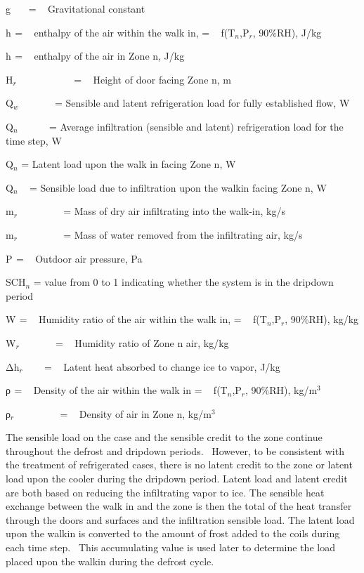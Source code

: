 g~~~ = ~ Gravitational constant

h\(_{ }\) = ~ enthalpy of the air within the walk in, = ~ f(T\(_{n}\),P\(_{r}\), 90\%RH), J/kg

h\(_{ }\) = ~ enthalpy of the air in Zone n, J/kg

H\(_{r}\)~~~~~~~~~~~ = ~ Height of door facing Zone n, m

Q\(_{w}\) ~~~~~~ = Sensible and latent refrigeration load for fully established flow, W

Q\(_{n}\) ~~~~~ = Average infiltration (sensible and latent) refrigeration load for the time step, W

Q\(_{n}\) = Latent load upon the walk in facing Zone n, W

Q\(_{n}\) ~ = Sensible load due to infiltration upon the walkin facing Zone n, W

m\(_{r}\) ~~~~~~~~ = Mass of dry air infiltrating into the walk-in, kg/s

m\(_{r}\) ~~~~~~~~ = Mass of water removed from the infiltrating air, kg/s

P\(_{ }\) = ~ Outdoor air pressure, Pa

SCH\(_{n}\) = value from 0 to 1 indicating whether the system is in the dripdown period

W\(_{ }\) = ~ Humidity ratio of the air within the walk in, = ~ f(T\(_{n}\),P\(_{r}\), 90\%RH), kg/kg

W\(_{r}\) ~~~~~~ = ~ Humidity ratio of Zone n air, kg/kg

Δh\(_{r}\) ~~~ = ~ Latent heat absorbed to change ice to vapor, J/kg

ρ\(_{ }\) = ~ Density of the air within the walk in = ~ f(T\(_{n}\),P\(_{r}\), 90\%RH), kg/m\(^{3}\)

ρ\(_{r}\) ~~~~~~~~ = ~ Density of air in Zone n, kg/m\(^{3}\)

The sensible load on the case and the sensible credit to the zone continue throughout the defrost and dripdown periods.~ However, to be consistent with the treatment of refrigerated cases, there is no latent credit to the zone or latent load upon the cooler during the dripdown period. Latent load and latent credit are both based on reducing the infiltrating vapor to ice. The sensible heat exchange between the walk in and the zone is then the total of the heat transfer through the doors and surfaces and the infiltration sensible load. The latent load upon the walkin is converted to the amount of frost added to the coils during each time step.~ This accumulating value is used later to determine the load placed upon the walkin during the defrost cycle.

